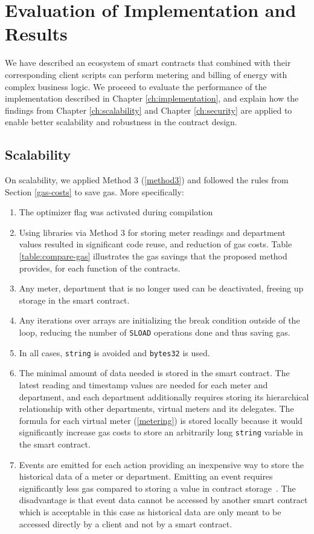 \chapter{Evaluation of Implementation and Results}\label{ch:results}

We have described an ecosystem of smart contracts that combined with their corresponding client scripts can perform metering and billing of energy with complex business logic. We proceed to evaluate the performance of the implementation described in Chapter \ref{ch:implementation}, and explain how the findings from Chapter \ref{ch:scalability} and Chapter \ref{ch:security} are applied to enable better scalability and robustness in the contract design.

\section{Scalability}
On scalability, we applied Method 3 (\ref{method3}) and followed the rules from Section \ref{gas-costs} to save gas. More specifically:

\begin{enumerate}
    \item The optimizer flag was activated during compilation
    \item Using libraries via Method 3 for storing meter readings and department values resulted in significant code reuse, and reduction of gas costs. Table \ref{table:compare-gas} illustrates the gas savings that the proposed method provides, for each function of the contracts.
    \item Any meter, department that is no longer used can be deactivated, freeing up storage in the smart contract.
    \item Any iterations over arrays are initializing the break condition outside of the loop, reducing the number of \texttt{SLOAD} operations done and thus saving gas.
    \item In all cases, \texttt{string} is avoided and \texttt{bytes32} is used. %
    \item The minimal amount of data needed is stored in the smart contract. The latest reading and timestamp values are needed for each meter and department, and each department additionally requires storing its hierarchical relationship with other departments, virtual meters and its delegates. The formula for each virtual meter (\ref{metering}) is stored locally because it would significantly increase gas costs to store an arbitrarily long \texttt{string} variable in the smart contract.
    \item Events are emitted for each action providing an inexpensive way to store the historical data of a meter or department. Emitting an event requires significantly less gas compared to storing a value in contract storage~\cite{events}. The disadvantage is that event data cannot be accessed by another smart contract which is acceptable in this case as historical data are only meant to be accessed directly by a client and not by a smart contract.
\end{enumerate}

